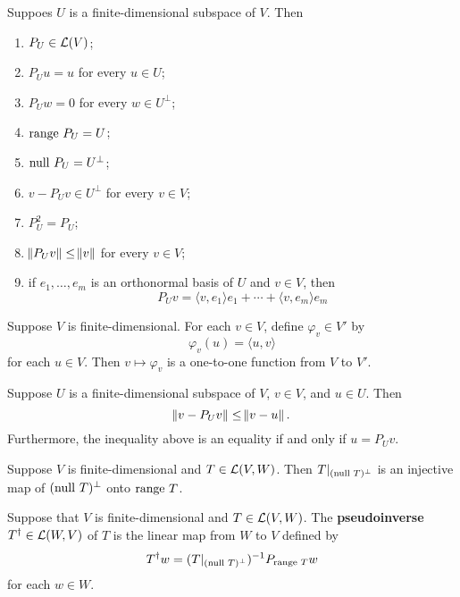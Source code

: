 \documentclass{extarticle}
\begin{document}
\begin{corollary}
    Suppoes \(U\) is a finite-dimensional subspace of \(V\). Then 
    \begin{enumerate}[label=(\alph*)]
        \item \(P_U \in \mathcal{L}(V)\); 
        \item \(P_U u = u\) for every \(u \in U\); 
        \item \(P_U w = 0\) for every \(w \in U^\perp\); 
        \item \(\text{range } P_U = U\); 
        \item \(\text{null } P_U = U^\perp\);  
        \item \(v - P_Uv \in U^\perp\) for every \(v \in V\); 
        \item \(P_U^2 = P_U\); 
        \item \(\norm{P_U v} \leq \norm{v}\) for every \(v \in V\); 
        \item if \(e_1, \ldots, e_m\) is an orthonormal basis of \(U\) and \(v \in V\), then 
        \[P_U v = \langle v,e_1 \rangle e_1 + \cdots + \langle v,e_m \rangle e_m\]
    \end{enumerate}
\end{corollary}


\begin{thm}
    Suppose \(V\) is finite-dimensional. For each \(v \in V\), define \(\varphi_v \in V'\) by 
    \[\varphi_v (u) = \langle u,v \rangle\]
    for each \(u \in V\). Then \(v \mapsto \varphi_v\) is a one-to-one function from \(V\) to 
    \(V'\).
\end{thm}


\begin{thm}
    Suppose \(U\) is a finite-dimensional subspace of \(V\), \(v \in V\), and \(u \in U\). Then 
    \[\norm{v - P_U v} \leq \norm{v - u}.\]
    Furthermore, the inequality above is an equality if and only if \(u = P_U v\).
\end{thm}

\begin{lemma}
    Suppose \(V\) is finite-dimensional and \(T \in \mathcal{L}(V, W)\). Then \(T |_{(\text{null } T)^\perp}\) is an 
    injective map of \((\text{null } T)^\perp\) onto \(\text{range } T\).
\end{lemma}


\begin{definition}
    Suppose that \(V\) is finite-dimensional and \(T \in \mathcal{L}(V, W)\). The \textbf{pseudoinverse} 
    \(T^\dagger \in \mathcal{L}(W, V)\) of \(T\) is the linear map from \(W\) to \(V\) defined by 
    \[T^\dagger w = (T|_{(\text{null } T)^\perp})^{-1} P_{\text{range } T} w\]
    for each \(w \in W\).
\end{definition}
\end{document}
